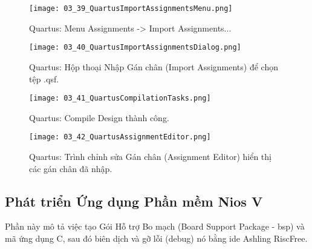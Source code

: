 \begin{figure}[htbp] \centering \texttt{[image: 03\_39\_QuartusImportAssignmentsMenu.png]} \caption{Quartus: Menu Assignments -> Import Assignments...} \label{fig:03_39} \end{figure}
\begin{figure}[htbp] \centering \texttt{[image: 03\_40\_QuartusImportAssignmentsDialog.png]} \caption{Quartus: Hộp thoại Nhập Gán chân (Import Assignments) để chọn tệp .qsf.} \label{fig:03_40} \end{figure}
\begin{figure}[htbp] \centering \texttt{[image: 03\_41\_QuartusCompilationTasks.png]} \caption{Quartus: Compile Design thành công.} \label{fig:03_41} \end{figure}
\begin{figure}[htbp] \centering \texttt{[image: 03\_42\_QuartusAssignmentEditor.png]} \caption{Quartus: Trình chỉnh sửa Gán chân (Assignment Editor) hiển thị các gán chân đã nhập.} \label{fig:03_42} \end{figure}

\FloatBarrier

\subsection{Phát triển Ứng dụng Phần mềm Nios V}
\label{sec:develop_software}

Phần này mô tả việc tạo Gói Hỗ trợ Bo mạch (Board Support Package - \acrshort{bsp}) và mã ứng dụng C, sau đó biên dịch và gỡ lỗi (debug) nó bằng \acrshort{ide} Ashling RiscFree.

